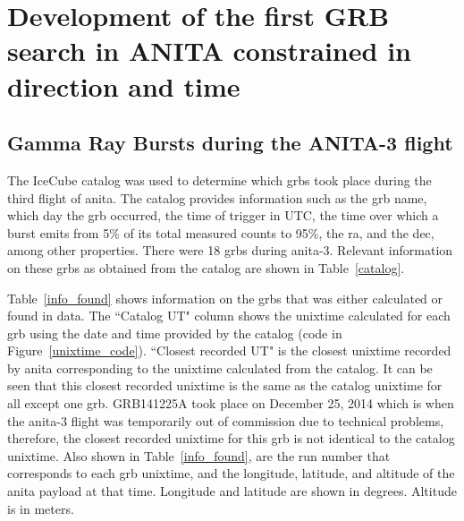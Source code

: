 \chapter{Development of the first GRB search in ANITA constrained in direction and time}
\label{grb_technique}

\section{Gamma Ray Bursts during the ANITA-3 flight}

The IceCube catalog was used to determine which \gls{grbs} took place during the third flight of \gls{anita}. The catalog provides information such as the \gls{grb} name, which day the \gls{grb} occurred, the time of trigger in UTC, the time over which a burst emits from 5\% of its total measured counts to 95\%, the \gls{ra}, and the \gls{dec}, among other properties. There were 18 \gls{grbs} during \gls{anita}-3. Relevant information on these \gls{grbs} as obtained from the catalog are shown in Table~\ref{catalog}. 

Table~\ref{info_found} shows information on the \gls{grbs} that was either calculated or found in data. 
The ``Catalog UT" column shows the unixtime calculated for each \gls{grb} using the date and time provided by the catalog (code in Figure~\ref{unixtime_code}). ``Closest recorded UT" is the closest unixtime recorded by \gls{anita} corresponding to the unixtime calculated from the catalog. It can be seen that this closest recorded unixtime is the same as the catalog unixtime for all except one \gls{grb}. GRB141225A took place on December 25, 2014 which is when the \gls{anita}-3 flight was temporarily out of commission due to technical problems, therefore, the closest recorded unixtime for this \gls{grb} is not identical to the catalog unixtime. Also shown in Table~\ref{info_found}, are the run number that corresponds to each \gls{grb} unixtime, and the longitude, latitude, and altitude of the \gls{anita} payload at that time. Longitude and latitude are shown in degrees. Altitude is in meters. 

